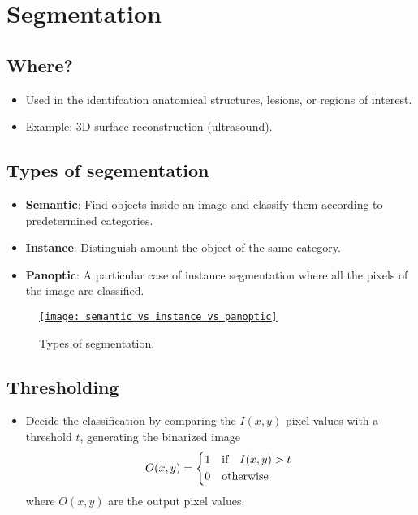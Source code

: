 \chapter{Segmentation}

\section{Where?}
\begin{itemize}
\item Used in the identifcation anatomical structures, lesions, or regions of interest.
\item Example: 3D surface reconstruction (ultrasound).
\end{itemize}
  
\section{Types of segementation}

\begin{itemize}
\item \textbf{Semantic}: Find objects inside an image and classify them according to predetermined categories.
\item \textbf{Instance}: Distinguish amount the object of the same category.
\item \textbf{Panoptic}: A particular case of instance segmentation where all the pixels of the image are classified.
\end{itemize}

\begin{figure}[H]
  \vspace{-0ex}
  \centering
  \href{https://www.labellerr.com/blog/semantic-vs-instance-vs-panoptic-which-image-segmentation-technique-to-choose/}{\texttt{[image: semantic\_vs\_instance\_vs\_panoptic]}}
  \caption{Types of segmentation.}
  \label{fig:types_segmentation}
\end{figure}

\section{Thresholding \cite{gonzalez2009digital}}
\begin{itemize}
\item Decide the classification by comparing the $I(x,y)$ pixel values with a threshold $t$, generating the binarized image
  \begin{equation}
    O(x,y) = \begin{cases*}
      1 & {\text if}\quad $I(x,y)>t$ \\
      0 & {\text otherwise}
    \end{cases*} 
  \end{equation}
  where $O(x,y)$ are the output pixel values.
\end{itemize}

